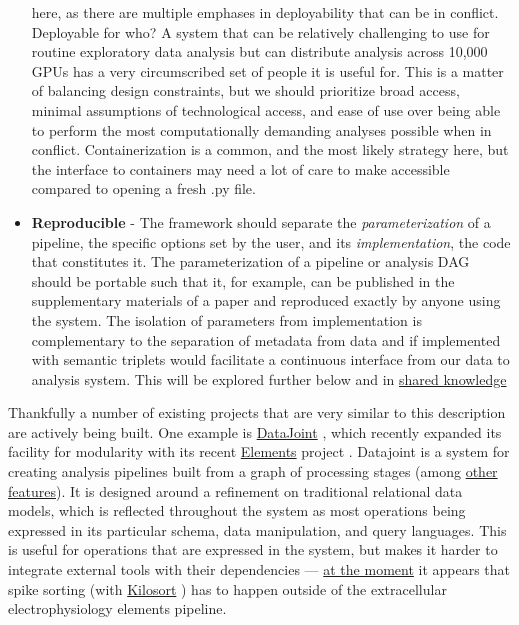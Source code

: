 \documentclass[notoc]{tufte-book}
\begin{document}
\begin{itemize}
  here, as there are multiple emphases in deployability that can be in
  conflict. Deployable for who? A system that can be relatively
  challenging to use for routine exploratory data analysis but can
  distribute analysis across 10,000 GPUs has a very circumscribed set of
  people it is useful for. This is a matter of balancing design
  constraints, but we should prioritize broad access, minimal
  assumptions of technological access, and ease of use over being able
  to perform the most computationally demanding analyses possible when
  in conflict. Containerization is a common, and the most likely
  strategy here, but the interface to containers may need a lot of care
  to make accessible compared to opening a fresh .py file.
\item
  \textbf{Reproducible} - The framework should separate the
  \emph{parameterization} of a pipeline, the specific options set by the
  user, and its \emph{implementation}, the code that constitutes it. The
  parameterization of a pipeline or analysis DAG should be portable such
  that it, for example, can be published in the supplementary materials
  of a paper and reproduced exactly by anyone using the system. The
  isolation of parameters from implementation is complementary to the
  separation of metadata from data and if implemented with semantic
  triplets would facilitate a continuous interface from our data to
  analysis system. This will be explored further below and in
  \protect\hyperlink{shared-knowledge}{shared knowledge}
\end{itemize}

Thankfully a number of existing projects that are very similar to this
description are actively being built. One example is
\href{https://datajoint.io/}{DataJoint} \citep{yatsenkoDataJointSimplerRelational2018} , which recently expanded its
facility for modularity with its recent
\href{https://github.com/datajoint/datajoint-elements}{Elements} project
\citep{yatsenkoDataJointElementsData2021} . Datajoint is a system
for creating analysis pipelines built from a graph of processing stages
(among
\href{https://docs.datajoint.org/python/v0.13/intro/01-Data-Pipelines.html\#what-is-datajoint}{other
features}). It is designed around a refinement on traditional relational
data models, which is reflected throughout the system as most operations
being expressed in its particular schema, data manipulation, and query
languages. This is useful for operations that are expressed in the
system, but makes it harder to integrate external tools with their
dependencies ---
\href{https://github.com/datajoint/element-array-ephys/blob/1fdbcf12d1a518e686b6b79e9fbe77b736cb606a/Background.md}{at
the moment} it appears that spike sorting (with
\href{https://github.com/MouseLand/Kilosort}{Kilosort} \citep{pachitariuKilosortRealtimeSpikesorting2016} ) has to happen outside
of the extracellular electrophysiology elements pipeline.
\end{document}
